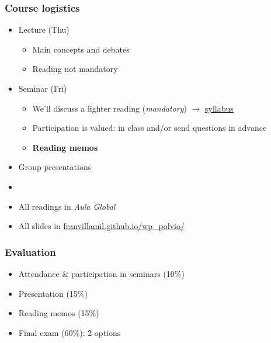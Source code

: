 \documentclass[aspectratio=43]{beamer}
\begin{document}





\begin{frame}
\frametitle{Course logistics}
\centering

\begin{itemize}
\item Lecture (Thu)
  \begin{itemize}
    \item Main concepts and debates
    \item Reading not mandatory
  \end{itemize}
\item Seminar (Fri)
  \begin{itemize}
    \item We'll discuss a lighter reading (\textit{mandatory}) $\rightarrow$ \href{https://raw.githack.com/franvillamil/syllabi/master/current/syllabus_war_peace_political_violence.pdf}{syllabus}
    \item Participation is valued: in class and/or send questions in advance
    \item \textbf{Reading memos}
  \end{itemize}
\item Group presentations
\item[]
\item All readings in \textit{Aula Global}
\item All slides in \href{https://franvillamil.github.io/wp_polvio/}{franvillamil.github.io/wp\_polvio/}
\end{itemize}

\end{frame}

\begin{frame}
\frametitle{Evaluation}
\centering

\begin{itemize}
\item Attendance \& participation in seminars (10\%)
\item Presentation (15\%)
\item Reading memos (15\%)
\item Final exam (60\%): 2 options
\end{itemize}

\end{frame}
\end{document}

